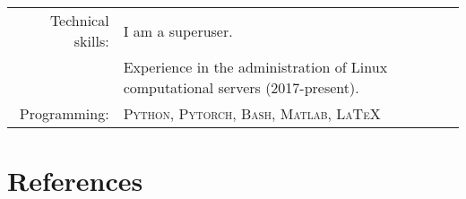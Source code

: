 \documentclass[a4paper,10pt]{article}
\begin{document}
\begin{tabular}{rp{12cm}}
	Technical skills:  & I am a superuser. \\
                     & Experience in the administration of Linux computational servers (2017-present).
                       \vspace{5pt}\\
	Programming:       & \textsc{Python, Pytorch, Bash, Matlab, \LaTeX}  \vspace{5pt}\\
\end{tabular}

\section{References}
\end{document}
